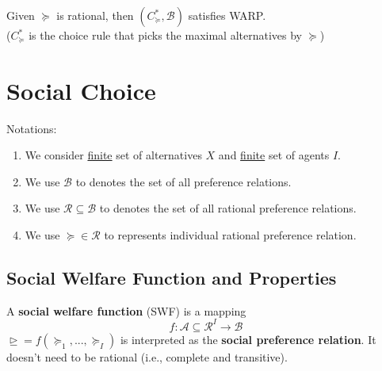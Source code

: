 \documentclass[11pt]{elegantbook}
\begin{document}
\begin{proposition}
    Given $\succeq$ is rational, then $(C^*_{\succeq},\mathcal{B})$ satisfies WARP.\\
    ($C^*_{\succeq}$ is the choice rule that picks the maximal alternatives by $\succeq$)
\end{proposition}


\section{Social Choice}
Notations:
\begin{enumerate}
    \item We consider \underline{finite} set of alternatives $X$ and \underline{finite} set of agents $I$.
    \item We use $\mathcal{B}$ to denotes the set of all preference relations.
    \item We use $\mathcal{R}\subseteq \mathcal{B}$ to denotes the set of all rational preference relations.
    \item We use $\succeq\in \mathcal{R}$ to represents individual rational preference relation.
\end{enumerate}

\subsection{Social Welfare Function and Properties}
\begin{definition}
    \normalfont
    A \textbf{social welfare function} (SWF) is a mapping $$f: \mathcal{A}\subseteq \mathcal{R}^I\rightarrow \mathcal{B}$$
    $\trianglerighteq=f(\succeq_1,...,\succeq_I)$ is interpreted as the \textbf{social preference relation}. It doesn't need to be rational (i.e., complete and transitive).
\end{definition}
\end{document}
